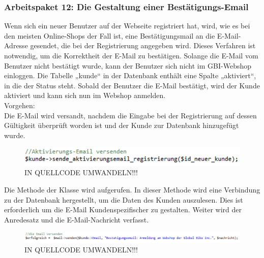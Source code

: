\newpage

\subsubsection{Arbeitspaket 12: Die Gestaltung einer Bestätigungs-Email}

Wenn sich ein neuer Benutzer auf der Webseite registriert hat, wird, wie es bei den meisten Online-Shops der Fall ist, eine Bestätigungsmail an die E-Mail-Adresse gesendet, die bei der Registrierung angegeben wird. Dieses Verfahren ist notwendig, um die Korrektheit der E-Mail zu bestätigen. 
Solange die E-Mail vom Benutzer nicht bestätigt wurde, kann der Benutzer sich nicht im GBI-Webshop einloggen. Die Tabelle „kunde“ in der Datenbank enthält eine Spalte „aktiviert“, in die der Status steht. Sobald der Benutzer die E-Mail bestätigt, wird der Kunde aktiviert und kann sich nun im Webshop anmelden.
\\
Vorgehen:
\\
Die E-Mail wird versandt, nachdem die Eingabe bei der Registrierung auf dessen Gültigkeit überprüft worden ist und der Kunde zur Datenbank hinzugefügt wurde. 

\begin{figure}[H]
\begin{center}
\includegraphics[width=12cm]{Bilder/Michael_Quellcode1.png}
\end{center}
\caption{IN QUELLCODE UMWANDELN!!!}
\end{figure}

Die Methode \grqq{} der Klasse \grqq{} wird aufgerufen. In dieser Methode wird eine Verbindung zu der Datenbank hergestellt, um die Daten des Kunden auszulesen.  Dies ist erforderlich um die E-Mail Kundenspezifischer zu gestalten.
Weiter wird der Anredesatz und die E-Mail-Nachricht verfasst.

\begin{figure}[H]
\begin{center}
\includegraphics[width=12cm]{Bilder/Michael_Quellcode2.png}
\end{center}
\caption{IN QUELLCODE UMWANDELN!!!}
\end{figure}

